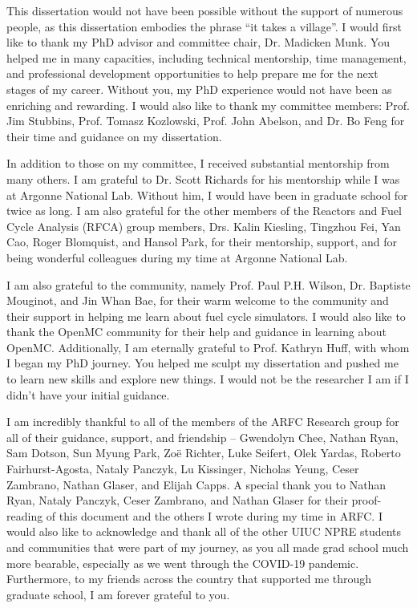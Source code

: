 This dissertation would not have been possible without the support 
of numerous people, as this dissertation embodies the phrase 
``it takes a village''. I would first like to thank my PhD advisor and 
committee chair, Dr. 
Madicken Munk. You helped me in many capacities, including technical 
mentorship, time management, and professional development opportunities 
to help prepare me for the next stages of my career. Without you, my PhD 
experience would not have been as enriching and rewarding. I would also like 
to thank my committee members: Prof. Jim Stubbins, Prof. Tomasz Kozlowski, 
Prof. John Abelson, and Dr. Bo Feng for their time and guidance on my dissertation. 

In addition to those on my committee, I received substantial mentorship from 
many others. I am grateful to Dr. Scott Richards for his mentorship while I 
was at Argonne National Lab. Without him, I would have been in graduate school 
for twice as long. I am also grateful for the other members of the 
Reactors and Fuel Cycle Analysis (RFCA) group members, Drs. Kalin
Kiesling, Tingzhou Fei, Yan Cao, Roger Blomquist, and Hansol Park, 
for their mentorship, support, and for being wonderful colleagues during my 
time at Argonne National Lab. 

I am also grateful to the \Cyclus community, namely Prof. 
Paul P.H. Wilson, Dr. Baptiste Mouginot, and Jin Whan Bae, for their warm 
welcome to the \Cyclus community and their support in helping me learn about 
fuel cycle simulators. I would also like to thank the OpenMC community 
for their help and guidance in learning about OpenMC. 
Additionally, I am eternally grateful to Prof. 
Kathryn Huff, with whom I began my PhD journey. You helped me sculpt my 
dissertation and pushed me to learn new skills and explore new things. 
I would not be the researcher I am if I didn't have your initial 
guidance. 

I am incredibly thankful to all of the members of the \gls{ARFC} Research 
group for all of their guidance, support, and friendship -- Gwendolyn 
Chee, 
Nathan Ryan, Sam Dotson, Sun Myung Park, Zo\"{e} Richter, Luke Seifert, 
Olek Yardas, Roberto Fairhurst-Agosta, Nataly Panczyk, Lu Kissinger, 
Nicholas Yeung, Ceser Zambrano, Nathan Glaser, and Elijah Capps. 
A special thank you to Nathan Ryan, Nataly Panczyk, Ceser Zambrano, 
and Nathan Glaser for their proof-reading of this document and the 
others I wrote during my 
time in \gls{ARFC}. I would also like to acknowledge and thank all of the other 
UIUC NPRE students and communities that were part of my journey, as 
you all made grad school much more bearable, especially as we went through 
the COVID-19 pandemic. Furthermore, to my friends across the country that 
supported me through graduate school, I am forever grateful to you. 


